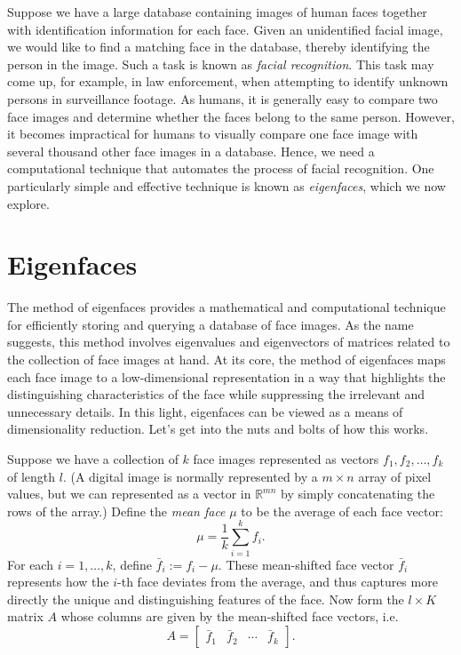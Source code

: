 \label{lab:FacialRecognition}


Suppose we have a large database containing images of human faces together with identification information for each face.
Given an unidentified facial image, we would like to find a matching face in the database, thereby identifying the person in the image.
Such a task is known as \emph{facial recognition}.
This task may come up, for example, in law enforcement, when attempting to identify unknown persons in surveillance footage.
As humans, it is generally easy to compare two face images and determine whether the faces belong to the same person.
However, it becomes impractical for humans to visually compare one face image with several thousand other face images in a database.
Hence, we need a computational technique that automates the process of facial recognition.
One particularly simple and effective technique is known as \emph{eigenfaces}, which we now explore.

\section*{Eigenfaces}
The method of eigenfaces provides a mathematical and computational technique for efficiently storing and querying a database of face images.
As the name suggests, this method involves eigenvalues and eigenvectors of matrices related to the collection of face images at hand.
At its core, the method of eigenfaces maps each face image to a low-dimensional representation in a way that highlights the distinguishing
characteristics of the face while suppressing the irrelevant and unnecessary details.
In this light, eigenfaces can be viewed as a means of dimensionality reduction.
Let's get into the nuts and bolts of how this works.

Suppose we have a collection of $k$ face images represented as vectors $f_1, f_2, \ldots, f_k$ of length $l$.
(A digital image is normally represented by a $m \times n$ array of pixel values, but we can represented as a vector in $\mathbb{R}^{mn}$ by simply concatenating the rows of the array.)
Define the \emph{mean face} $\mu$ to be the average of each face vector:
\[
\mu = \frac{1}{k}\sum_{i=1}^k f_i.
\]
For each $i = 1,\ldots, k$, define $\bar{f}_i := f_i - \mu$.
These mean-shifted face vector $\bar{f}_i$ represents how the $i$-th face deviates from the average, and thus captures more directly the unique and distinguishing features of the face.
Now form the $l \times K$ matrix $A$ whose columns are given by the mean-shifted face vectors, i.e.
\[
A = \begin{bmatrix}
\bar{f}_1 & \bar{f}_2 & \cdots & \bar{f}_k
\end{bmatrix}.
\]

